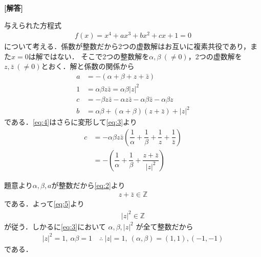 \documentclass[../../main.tex]{subfiles}
\begin{document}
\begin{oframed}
  
\end{oframed}

{\bf [解答]}

与えられた方程式
\begin{align}
  f(x) = x^4+ax^3+bx^2+cx+1 = 0 \label{eq:1}
\end{align}
について考える．係数が整数だから2つの虚数解はお互いに複素共役であり，また$x=0$は解ではない．
そこで2つの整数解を$\alpha,\beta \ (\neq 0)$，2つの虚数解を$z,\bar z \ (\neq 0)$とおく．解と係数の関係から
\begin{align}
  a&=-(\alpha+\beta+z+\bar z) \label{eq:2}\\
  1&=\alpha\beta z\bar z=\alpha\beta|z|^2 \label{eq:3}\\
  c&=-\beta z\bar z - \alpha z\bar z - \alpha\beta \bar z - \alpha\beta z \label{eq:4}\\
  b&=\alpha\beta+(\alpha+\beta)(z+\bar z)+|z|^2 \label{eq:5}
\end{align}
である．\cref{eq:4}はさらに変形して\cref{eq:3}より
\begin{align}
  c&=-\alpha\beta z\bar z\left(\dfrac{1}{\alpha}+\dfrac{1}{\beta}+\dfrac{1}{z}+\dfrac{1}{\bar z}\right)\\
  &=-\left(\dfrac{1}{\alpha}+\dfrac{1}{\beta}+\dfrac{z+\bar z}{|z|^2}\right) \label{eq:6}
\end{align}

題意より$\alpha,\beta, a$が整数だから\cref{eq:2}より
\begin{align}
  z+\bar z \in \mathbb{Z} \label{eq:7}
\end{align}
である．よって\cref{eq:5}より
\begin{align}
  |z|^2 \in \mathbb{Z}
\end{align}
が従う．しかるに\cref{eq:3}において $\alpha,\beta,|z|^2$ が全て整数だから
\begin{align}
  |z|^2=1,\ \alpha\beta=1
  \quad\therefore\
  |z|=1,\ (\alpha,\beta)=(1,1),(-1,-1) \label{eq:8}
\end{align}
である．
\end{document}
